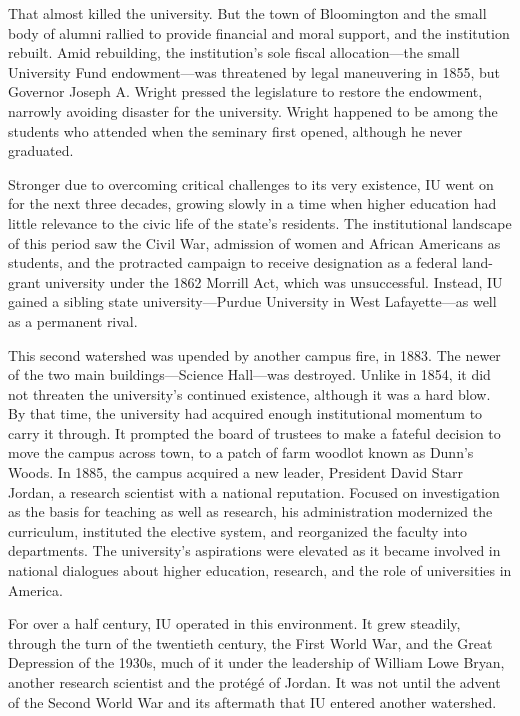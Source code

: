 \documentclass[
  american,
  letterpaper,
]{scrreprt}
\begin{document}
That almost killed the university. But the town of Bloomington and the
small body of alumni rallied to provide financial and moral support, and
the institution rebuilt. Amid rebuilding, the institution's sole fiscal
allocation---the small University Fund endowment---was threatened by
legal maneuvering in 1855, but Governor Joseph A. Wright pressed the
legislature to restore the endowment, narrowly avoiding disaster for the
university. Wright happened to be among the students who attended when
the seminary first opened, although he never graduated.

Stronger due to overcoming critical challenges to its very existence, IU
went on for the next three decades, growing slowly in a time when higher
education had little relevance to the civic life of the state's
residents. The institutional landscape of this period saw the Civil War,
admission of women and African Americans as students, and the protracted
campaign to receive designation as a federal land-grant university under
the 1862 Morrill Act, which was unsuccessful. Instead, IU gained a
sibling state university---Purdue University in West Lafayette---as well
as a permanent rival.

This second watershed was upended by another campus fire, in 1883. The
newer of the two main buildings---Science Hall---was destroyed. Unlike
in 1854, it did not threaten the university's continued existence,
although it was a hard blow. By that time, the university had acquired
enough institutional momentum to carry it through. It prompted the board
of trustees to make a fateful decision to move the campus across town,
to a patch of farm woodlot known as Dunn's Woods. In 1885, the campus
acquired a new leader, President David Starr Jordan, a research
scientist with a national reputation. Focused on investigation as the
basis for teaching as well as research, his administration modernized
the curriculum, instituted the elective system, and reorganized the
faculty into departments. The university's aspirations were elevated as
it became involved in national dialogues about higher education,
research, and the role of universities in America.

For over a half century, IU operated in this environment. It grew
steadily, through the turn of the twentieth century, the First World
War, and the Great Depression of the 1930s, much of it under the
leadership of William Lowe Bryan, another research scientist and the
protégé of Jordan. It was not until the advent of the Second World War
and its aftermath that IU entered another watershed.
\end{document}

